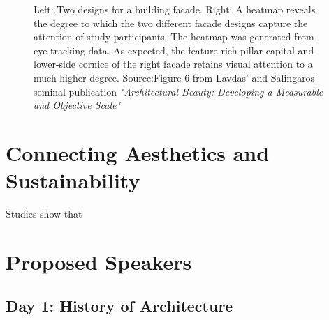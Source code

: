 \documentclass{article}
\begin{document}
\begin{figure}[ht!]
    \centering
    \caption{Left: Two designs for a building facade. Right: A heatmap reveals the degree to which the two different facade designs capture the attention of study participants. The heatmap was generated from eye-tracking data. As expected, the feature-rich pillar capital and lower-side cornice of the right facade retains visual attention to a much higher degree. Source:Figure 6 from Lavdas' and Salingaros' seminal publication \textit{"Architectural Beauty: Developing a Measurable and Objective Scale"} \cite{lavdas_architectural_2022}}
    \label{fig:heatmap}
\end{figure}

\clearpage
\section{Connecting Aesthetics and Sustainability}

Studies show that 


\clearpage
\section{Proposed Speakers}

\subsection{Day 1: History of Architecture}
\end{document}
